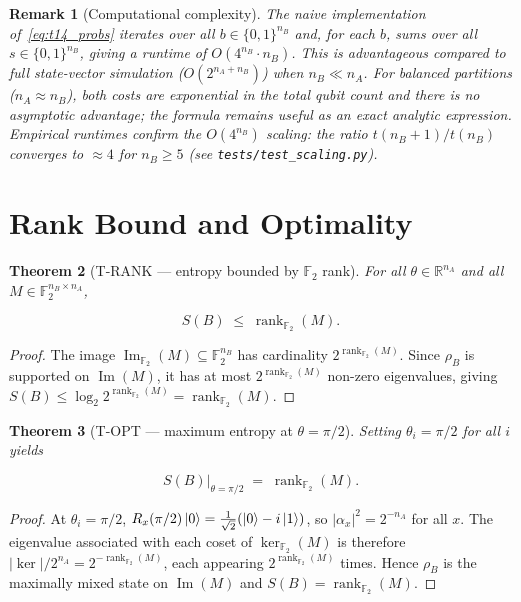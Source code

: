 \documentclass[11pt,a4paper]{article}
\newtheorem{theorem}{Theorem}[section]
\newtheorem{remark}[theorem]{Remark}
\newcommand{\F}{\mathbb{F}}
\newcommand{\rk}{\operatorname{rank}_{\F_2}}
\newcommand{\VNE}{S}
\begin{document}
\begin{remark}[Computational complexity]
\label{rem:complexity}
The naive implementation of~\eqref{eq:t14_probs} iterates over all
$b \in \{0,1\}^{n_B}$ and, for each $b$, sums over all
$s \in \{0,1\}^{n_B}$, giving a runtime of $O(4^{n_B} \cdot n_B)$.
This is advantageous compared to full state-vector simulation
($O(2^{n_A + n_B})$) when $n_B \ll n_A$.  For balanced partitions
($n_A \approx n_B$), both costs are exponential in the total qubit count
and there is no asymptotic advantage; the formula remains useful as an
exact analytic expression.  Empirical runtimes confirm the $O(4^{n_B})$
scaling: the ratio $t(n_B{+}1)/t(n_B)$ converges to $\approx 4$ for
$n_B \geq 5$ (see \texttt{tests/test\_scaling.py}).
\end{remark}

\section{Rank Bound and Optimality}
\label{sec:rank_bound}

\begin{theorem}[T-RANK --- entropy bounded by $\F_2$ rank]
\label{thm:trank}
For all $\theta \in \mathbb{R}^{n_A}$ and all $M \in \F_2^{n_B \times n_A}$,

\begin{equation}
  \VNE(B) \;\leq\; \rk(M).
  \label{eq:trank}
\end{equation}
\end{theorem}

\begin{proof}
The image $\operatorname{Im}_{\F_2}(M) \subseteq \F_2^{n_B}$ has cardinality
$2^{\rk(M)}$.  Since $\rho_B$ is supported on $\operatorname{Im}(M)$, it has
at most $2^{\rk(M)}$ non-zero eigenvalues, giving
$\VNE(B) \leq \log_2 2^{\rk(M)} = \rk(M)$.
\end{proof}

\begin{theorem}[T-OPT --- maximum entropy at $\theta = \pi/2$]
\label{thm:topt}
Setting $\theta_i = \pi/2$ for all $i$ yields

\begin{equation}
  \VNE(B)\big|_{\theta = \pi/2} \;=\; \rk(M).
  \label{eq:topt}
\end{equation}
\end{theorem}

\begin{proof}
At $\theta_i = \pi/2$, $R_x(\pi/2)\ket{0} = \frac{1}{\sqrt{2}}(\ket{0} - i\ket{1})$,
so $|\alpha_x|^2 = 2^{-n_A}$ for all $x$.  The eigenvalue associated with
each coset of $\ker_{\F_2}(M)$ is therefore $|\ker|/2^{n_A} = 2^{-\rk(M)}$,
each appearing $2^{\rk(M)}$ times.  Hence $\rho_B$ is the maximally mixed
state on $\operatorname{Im}(M)$ and $\VNE(B) = \rk(M)$.
\end{proof}
\end{document}
